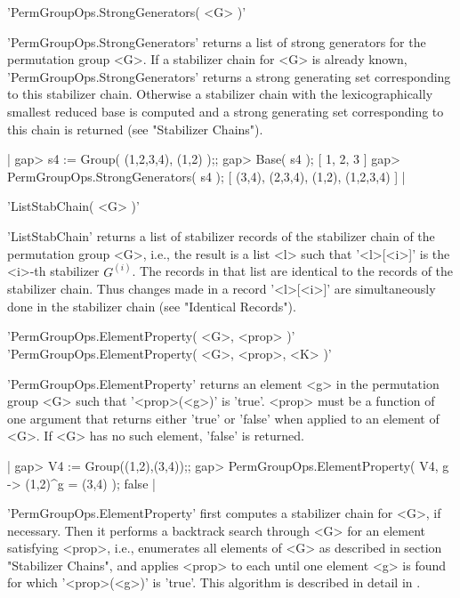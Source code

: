 
'PermGroupOps.StrongGenerators( <G> )'

'PermGroupOps.StrongGenerators' returns a list of  strong generators  for
the permutation  group <G>.  If  a  stabilizer  chain for <G>  is already
known,  'PermGroupOps.StrongGenerators'  returns a strong  generating set
corresponding  to  this stabilizer chain.  Otherwise a  stabilizer  chain
with the lexicographically smallest reduced base is computed and a strong
generating  set corresponding to this chain is returned  (see "Stabilizer
Chains").

|    gap> s4 := Group( (1,2,3,4), (1,2) );;
    gap> Base( s4 );
    [ 1, 2, 3 ]
    gap> PermGroupOps.StrongGenerators( s4 );
    [ (3,4), (2,3,4), (1,2), (1,2,3,4) ] |


'ListStabChain( <G> )'

'ListStabChain'  returns a list  of stabilizer  records of the stabilizer
chain of the  permutation group <G>, i.e., the result  is a list <l> such
that '<l>[<i>]' is the <i>-th stabilizer  $G^{(i)}$.  The records in that
list are identical to the records of the  stabilizer chain.  Thus changes
made  in a record  '<l>[<i>]'  are simultaneously done in  the stabilizer
chain (see "Identical Records").


'PermGroupOps.ElementProperty( <G>, <prop> )' \\
'PermGroupOps.ElementProperty( <G>, <prop>, <K> )'

'PermGroupOps.ElementProperty' returns an element  <g> in the permutation
group <G> such that '<prop>(<g>)'  is 'true'.  <prop>  must be a function
of one  argument that  returns either 'true'  or 'false'  when applied to
an element of <G>.  If <G> has no such element, 'false' is returned.

|    gap> V4 := Group((1,2),(3,4));;
    gap> PermGroupOps.ElementProperty( V4, g -> (1,2)^g = (3,4) );
    false |

'PermGroupOps.ElementProperty' first computes a stabilizer chain for <G>,
if necessary.   Then  it performs a backtrack search through  <G>  for an
element  satisfying  <prop>,  i.e.,  enumerates  all  elements  of <G> as
described in  section "Stabilizer  Chains", and applies  <prop>  to  each
until one element  <g> is found for which '<prop>(<g>)' is  'true'.  This
algorithm is described in detail in \cite{But82}.

